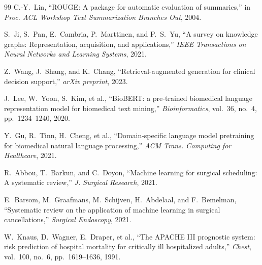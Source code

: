 \documentclass[10pt,twocolumn]{article}
\begin{document}
\begin{thebibliography}{99}
C.-Y.~Lin,
``ROUGE: A package for automatic evaluation of summaries,''
in \textit{Proc. ACL Workshop Text Summarization Branches Out}, 2004.

S.~Ji, S.~Pan, E.~Cambria, P.~Marttinen, and P.~S.~Yu,
``A survey on knowledge graphs: Representation, acquisition, and applications,''
\textit{IEEE Transactions on Neural Networks and Learning Systems}, 2021.

Z.~Wang, J.~Shang, and K.~Chang,
``Retrieval-augmented generation for clinical decision support,''
\textit{arXiv preprint}, 2023.

J.~Lee, W.~Yoon, S.~Kim, et al.,
``BioBERT: a pre-trained biomedical language representation model for biomedical text mining,''
\textit{Bioinformatics}, vol.~36, no.~4, pp.~1234--1240, 2020.

Y.~Gu, R.~Tinn, H.~Cheng, et al.,
``Domain-specific language model pretraining for biomedical natural language processing,''
\textit{ACM Trans. Computing for Healthcare}, 2021.

R.~Abbou, T.~Barkun, and C.~Doyon,
``Machine learning for surgical scheduling: A systematic review,''
\textit{J. Surgical Research}, 2021.

E.~Barsom, M.~Graafmans, M.~Schijven, H.~Abdelaal, and F.~Bemelman,
``Systematic review on the application of machine learning in surgical cancellations,''
\textit{Surgical Endoscopy}, 2021.

W.~Knaus, D.~Wagner, E.~Draper, et al.,
``The APACHE III prognostic system: risk prediction of hospital mortality for critically ill hospitalized adults,''
\textit{Chest}, vol.~100, no.~6, pp.~1619--1636, 1991.

\end{thebibliography}
\end{document}
